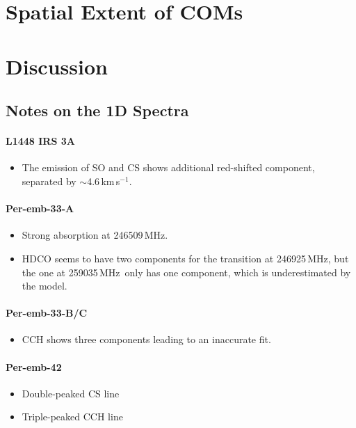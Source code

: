 \documentclass[twocolumn]{aastex62}
\newcommand{\kms}{\mbox{\,km\,s$^{-1}$}}
\newcommand{\mhz}{\mbox{\,MHz}}
\begin{document}
\section{Spatial Extent of COMs}
\section{Discussion}
\subsection{Notes on the 1D Spectra}
\paragraph{L1448 IRS 3A}
\begin{itemize}
  \item The emission of SO and CS shows additional red-shifted component, separated by $\sim$4.6\kms.
\end{itemize}

\paragraph{Per-emb-33-A}
\begin{itemize}
  \item Strong absorption at 246509\mhz.
  \item HDCO seems to have two components for the transition at 246925\mhz, but the one at 259035\mhz\ only has one component, which is underestimated by the model.
\end{itemize}

\paragraph{Per-emb-33-B/C}
\begin{itemize}
  \item CCH shows three components leading to an inaccurate fit.
\end{itemize}

\paragraph{Per-emb-42}
\begin{itemize}
  \item Double-peaked CS line
  \item Triple-peaked CCH line
\end{itemize}
\end{document}
